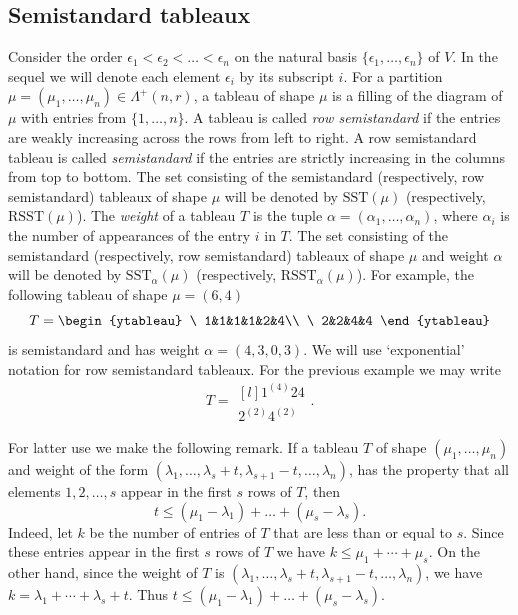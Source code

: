 \documentclass[ALCO,Unicode]{cedram}
\newcommand{\m}{\mu}
\newcommand{\la}{\lambda}
\numberwithin{equation}{section}
\begin{document}
\subsection{Semistandard tableaux}\label{s2.2}
	Consider the order $\epsilon_1 < \epsilon_2 <\dots< \epsilon_n$ on the natural basis $\{\epsilon_1,\dots,\epsilon_n\}$ of $V$. In the sequel we will denote each element $\epsilon_i$ by its subscript $i$. For a partition $\mu=(\mu_1,\dots,\mu_n) \in \Lambda^+(n,r)$, a tableau of shape $\mu$ is a filling of the diagram of $\mu$ with entries from $\{1,\dots,n\}$. A tableau is called \textit{row semistandard} if the entries are weakly increasing across the rows from left to right.  A row semistandard tableau is called \textit{semistandard} if the entries are strictly increasing in the columns from top to bottom. The set consisting of the semistandard (respectively, row semistandard) tableaux of shape $\mu$ will be denoted by $\mathrm{SST}(\mu)$ (respectively, $\mathrm{RSST}(\mu)$). The \textit{weight} of a tableau $T$ is the tuple $\alpha=(\alpha_1,\dots,\alpha_n)$, where $\alpha_i$ is the number of appearances of the entry $i$ in $T$. The set consisting of the semistandard (respectively, row semistandard) tableaux of shape $\mu$ and weight $\alpha$ will be denoted by $\mathrm{SST}_{\alpha}(\mu)$ (respectively, $\mathrm{RSST}_{\alpha}(\mu)$). For example, the following tableau of shape $\mu=(6,4)$
\[T= \begin{ytableau}
		\ 1&1&1&1&2&4\\
		\ 2&2&4&4 
	\end{ytableau} \]
is semistandard and has weight $\alpha=(4,3,0,3)$. We will use `exponential' notation for row semistandard tableaux. For the previous example we may write \[ T=\begin{matrix*}[l]
	1^{(4)} 2 4 \\
	2^{(2)}4^{(2)}  \end{matrix*}. \] 
\begin{rema}\label{obv}For latter use we make the following remark. If a tableau $T$ of shape $(\mu_1,\dots,\m_n)$ and weight of the form $(\la_1,\dots,\la_{s}+t, \la_{s+1}-t, \dots,\la_n)$, has the property that all elements $1,2,\dots,s$ appear in the first $s$ rows of $T$, then \[t \le (\mu_1 - \lambda_1)+\dots+(\mu_s - \lambda_s).\] Indeed, let $k$ be the number of entries of $T$ that are less than or equal to $s$. Since these entries appear in the first $s$ rows of $T$ we have $k \le \mu_1+\cdots +\mu_s.$ On the other hand, since the weight of $T$ is $(\la_1,\dots,\la_{s}+t, \la_{s+1}-t, \dots,\la_n)$, we have $k=\lambda_1+ \cdots +\lambda_s + t.$ Thus $t \le (\mu_1 - \lambda_1)+\dots+(\mu_s - \lambda_s)$.
\end{rema}
\end{document}
